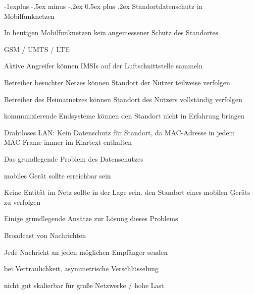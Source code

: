 \documentclass[a4paper]{article}
\makeatletter
\renewcommand{\subsection}{\@startsection{subsection}{2}{0mm}%
 {-1explus -.5ex minus -.2ex}%
 {0.5ex plus .2ex}%
 {\normalfont\normalsize\bfseries}}
\makeatother
\begin{document}
\begin{multicols}{3}
      \subsection{Standortdatenschutz in Mobilfunknetzen}
      \begin{itemize*}
            \item In heutigen Mobilfunknetzen kein angemessener Schutz des Standortes
            \begin{itemize*}
                  \item GSM / UMTS / LTE
                  \item Aktive Angreifer können IMSIs auf der Luftschnittstelle sammeln
                  \item Betreiber besuchter Netzes können Standort der Nutzer teilweise verfolgen
                  \item Betreiber des Heimatnetzes können Standort des Nutzers vollständig verfolgen
                  \item kommunizierende Endsysteme können den Standort nicht in Erfahrung bringen
            \end{itemize*}
            \item Drahtloses LAN: Kein Datenschutz für Standort, da MAC-Adresse in jedem MAC-Frame immer im Klartext enthalten
            \item Das grundlegende Problem des Datenschutzes
            \begin{itemize*}
                  \item mobiles Gerät sollte erreichbar sein
                  \item Keine Entität im Netz sollte in der Lage sein, den Standort eines mobilen Geräts zu verfolgen
            \end{itemize*}
            \item Einige grundlegende Ansätze zur Lösung dieses Problems
            \begin{description*}
                  \item[Broadcast von Nachrichten]
                  \begin{itemize*}
                        \item Jede Nachricht an jeden möglichen Empfänger senden
                        \item bei Vertraulichkeit, asymmetrische Verschlüsselung
                        \item nicht gut skalierbar für große Netzwerke / hohe Last
                  \end{itemize*}

\end{description*}
\end{itemize*}
\end{multicols}
\end{document}
